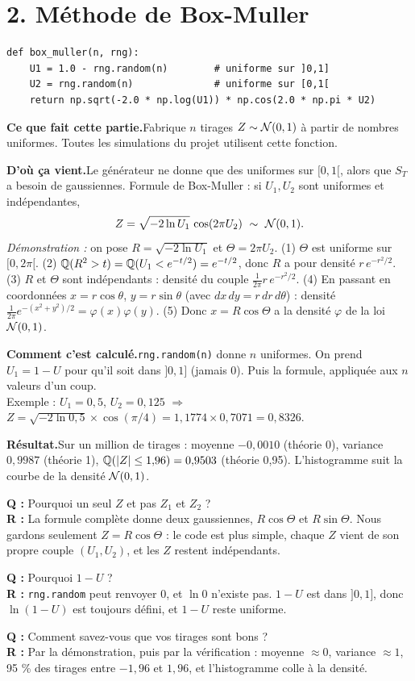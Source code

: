 \documentclass[11pt,a4paper]{article}
\newcommand{\quoi}[1]{\par\noindent\textbf{\color{bleu}Ce que fait cette partie.}\enspace #1\par}
\newcommand{\source}[1]{\par\noindent\textbf{\color{orange}D'où ça vient.}\enspace #1\par}
\newcommand{\calcul}[1]{\par\noindent\textbf{\color{bleu}Comment c'est calculé.}\enspace #1\par}
\newcommand{\resultat}[1]{\par\noindent\textbf{\color{vert}Résultat.}\enspace #1\par}
\newcommand{\prof}[2]{\begin{tcolorbox}[colback=orange!6,colframe=orange!80,boxrule=0.4pt,arc=2pt,left=5pt,right=5pt,top=2pt,bottom=2pt]\small\textbf{Q :} #1\\[1pt]\textbf{R :} #2\end{tcolorbox}}
\newcommand{\sect}[1]{\clearpage\section{#1}}
\begin{document}
\sect{2. Méthode de Box-Muller}
\begin{lstlisting}
def box_muller(n, rng):
    U1 = 1.0 - rng.random(n)        # uniforme sur ]0,1]
    U2 = rng.random(n)              # uniforme sur [0,1[
    return np.sqrt(-2.0 * np.log(U1)) * np.cos(2.0 * np.pi * U2)
\end{lstlisting}
\quoi{Fabrique $n$ tirages $Z\sim\mathcal{N}(0,1)$ à partir de nombres uniformes. Toutes les simulations du projet utilisent cette fonction.}
\source{Le générateur ne donne que des uniformes sur $[0,1[$, alors que $S_T$ a besoin de gaussiennes. Formule de Box-Muller : si $U_1,U_2$ sont uniformes et indépendantes,
\[ Z = \sqrt{-2\ln U_1}\,\cos(2\pi U_2)\ \sim\ \mathcal{N}(0,1). \]
\emph{Démonstration :} on pose $R = \sqrt{-2\ln U_1}$ et $\Theta = 2\pi U_2$.
(1) $\Theta$ est uniforme sur $[0,2\pi[$.
(2) $\mathbb{Q}(R^2>t) = \mathbb{Q}(U_1<e^{-t/2}) = e^{-t/2}$, donc $R$ a pour densité $r\,e^{-r^2/2}$.
(3) $R$ et $\Theta$ sont indépendants : densité du couple $\frac{1}{2\pi}r\,e^{-r^2/2}$.
(4) En passant en coordonnées $x = r\cos\theta$, $y = r\sin\theta$ (avec $dx\,dy = r\,dr\,d\theta$) : densité $\frac{1}{2\pi}e^{-(x^2+y^2)/2} = \varphi(x)\varphi(y)$.
(5) Donc $x = R\cos\Theta$ a la densité $\varphi$ de la loi $\mathcal{N}(0,1)$.}
\calcul{\texttt{rng.random(n)} donne $n$ uniformes. On prend $U_1 = 1-U$ pour qu'il soit dans $]0,1]$ (jamais 0). Puis la formule, appliquée aux $n$ valeurs d'un coup.\\
Exemple : $U_1 = 0{,}5$, $U_2 = 0{,}125$ $\Rightarrow$ $Z = \sqrt{-2\ln0{,}5}\times\cos(\pi/4) = 1{,}1774\times0{,}7071 = 0{,}8326$.}
\resultat{Sur un million de tirages : moyenne $-0{,}0010$ (théorie 0), variance $0{,}9987$ (théorie 1), $\mathbb{Q}(|Z|\le1{,}96) = 0{,}9503$ (théorie 0,95). L'histogramme suit la courbe de la densité $\mathcal{N}(0,1)$.}
\prof{Pourquoi un seul $Z$ et pas $Z_1$ et $Z_2$ ?}{La formule complète donne deux gaussiennes, $R\cos\Theta$ et $R\sin\Theta$. Nous gardons seulement $Z = R\cos\Theta$ : le code est plus simple, chaque $Z$ vient de son propre couple $(U_1,U_2)$, et les $Z$ restent indépendants.}
\prof{Pourquoi $1-U$ ?}{\texttt{rng.random} peut renvoyer 0, et $\ln 0$ n'existe pas. $1-U$ est dans $]0,1]$, donc $\ln(1-U)$ est toujours défini, et $1-U$ reste uniforme.}
\prof{Comment savez-vous que vos tirages sont bons ?}{Par la démonstration, puis par la vérification : moyenne $\approx0$, variance $\approx1$, 95 \% des tirages entre $-1{,}96$ et $1{,}96$, et l'histogramme colle à la densité.}
\end{document}

